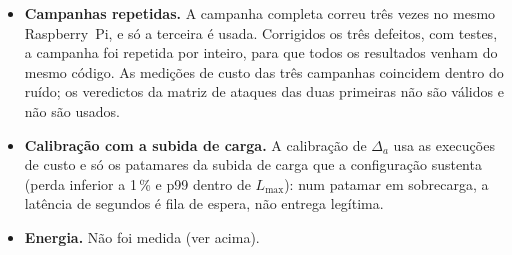 \begin{itemize}[leftmargin=*]
{    sensor). A etapa de custo e subida de carga falhou na execução 70 de 120 (o
    \emph{gateway} não respondeu ao pedido de resumo; origem não determinada) e
    foi repetida sozinha, no mesmo \emph{commit} e com os mesmos argumentos
    (Tabela~\ref{tab:campanhas}).}
  \item \textbf{Campanhas repetidas.} A campanha completa correu três vezes no
    mesmo Raspberry~Pi, e só a terceira é usada.  Corrigidos
    os três defeitos, com testes, a campanha foi repetida por inteiro, para que
    todos os resultados venham do mesmo código. As medições de custo das três
    campanhas coincidem dentro do ruído; os veredictos da matriz de ataques das
    duas primeiras não são válidos e não são usados.
  \item \textbf{Calibração com a subida de carga.} A calibração de $\Delta_a$
    usa as execuções de custo e só os patamares da subida de carga que a
    configuração sustenta (perda inferior a 1\,\% e p99 dentro de $L_{\max}$):
    num patamar em sobrecarga, a latência de segundos é fila de espera, não
    entrega legítima.
  \item \textbf{Energia.} Não foi medida (ver acima).
\end{itemize}

